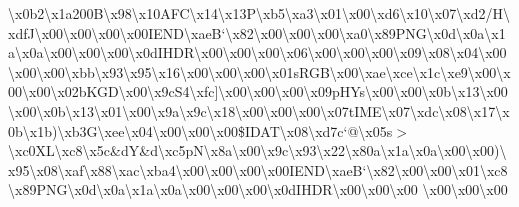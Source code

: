 \begin{DoxyCompactItemize}
\textbackslash{}x0b2\textbackslash{}x1a200\+B\textbackslash{}x98\textbackslash{}x10\+A\+F\+C\textbackslash{}x14\textbackslash{}x13\+P\textbackslash{}xb5\textbackslash{}xa3\textbackslash{}x01\textbackslash{}x00\textbackslash{}xd6\textbackslash{}x10\textbackslash{}x07\textbackslash{}xd2/\+H\textbackslash{}xdf\+J\textbackslash{}x00\textbackslash{}x00\textbackslash{}x00\textbackslash{}x00\+I\+E\+N\+D\textbackslash{}xae\+B`\textbackslash{}x82\textbackslash{}x00\textbackslash{}x00\textbackslash{}x00\textbackslash{}xa0\textbackslash{}x89\+P\+N\+G\textbackslash{}x0d\textbackslash{}x0a\textbackslash{}x1a\textbackslash{}x0a\textbackslash{}x00\textbackslash{}x00\textbackslash{}x00\textbackslash{}x0d\+I\+H\+D\+R\textbackslash{}x00\textbackslash{}x00\textbackslash{}x00\textbackslash{}x06\textbackslash{}x00\textbackslash{}x00\textbackslash{}x00\textbackslash{}x09\textbackslash{}x08\textbackslash{}x04\textbackslash{}x00\textbackslash{}x00\textbackslash{}x00\textbackslash{}xbb\textbackslash{}x93\textbackslash{}x95\textbackslash{}x16\textbackslash{}x00\textbackslash{}x00\textbackslash{}x00\textbackslash{}x01s\+R\+G\+B\textbackslash{}x00\textbackslash{}xae\textbackslash{}xce\textbackslash{}x1c\textbackslash{}xe9\textbackslash{}x00\textbackslash{}x00\textbackslash{}x00\textbackslash{}x02b\+K\+G\+D\textbackslash{}x00\textbackslash{}x9c\+S4\textbackslash{}xfc\mbox{]}\textbackslash{}x00\textbackslash{}x00\textbackslash{}x00\textbackslash{}x09p\+H\+Ys\textbackslash{}x00\textbackslash{}x00\textbackslash{}x0b\textbackslash{}x13\textbackslash{}x00\textbackslash{}x00\textbackslash{}x0b\textbackslash{}x13\textbackslash{}x01\textbackslash{}x00\textbackslash{}x9a\textbackslash{}x9c\textbackslash{}x18\textbackslash{}x00\textbackslash{}x00\textbackslash{}x00\textbackslash{}x07t\+I\+M\+E\textbackslash{}x07\textbackslash{}xdc\textbackslash{}x08\textbackslash{}x17\textbackslash{}x0b\textbackslash{}x1b)\textbackslash{}xb3\+G\textbackslash{}xee\textbackslash{}x04\textbackslash{}x00\textbackslash{}x00\textbackslash{}x00\$\+I\+D\+A\+T\textbackslash{}x08\textbackslash{}xd7c`@\textbackslash{}x05s$>$\textbackslash{}xc0\+X\+L\textbackslash{}xc8\textbackslash{}x5c\&d\+Y\&d\textbackslash{}xc5p\+N\textbackslash{}x8a\textbackslash{}x00\textbackslash{}x9c\textbackslash{}x93\textbackslash{}x22\textbackslash{}x80a\textbackslash{}x1a\textbackslash{}x0a\textbackslash{}x00\textbackslash{}x00)\textbackslash{}x95\textbackslash{}x08\textbackslash{}xaf\textbackslash{}x88\textbackslash{}xac\textbackslash{}xba4\textbackslash{}x00\textbackslash{}x00\textbackslash{}x00\textbackslash{}x00\+I\+E\+N\+D\textbackslash{}xae\+B`\textbackslash{}x82\textbackslash{}x00\textbackslash{}x00\textbackslash{}x01\textbackslash{}xc8\textbackslash{}x89\+P\+N\+G\textbackslash{}x0d\textbackslash{}x0a\textbackslash{}x1a\textbackslash{}x0a\textbackslash{}x00\textbackslash{}x00\textbackslash{}x00\textbackslash{}x0d\+I\+H\+D\+R\textbackslash{}x00\textbackslash{}x00\textbackslash{}x00 \textbackslash{}x00\textbackslash{}x00\textbackslash{}x00 
\end{DoxyCompactItemize}
